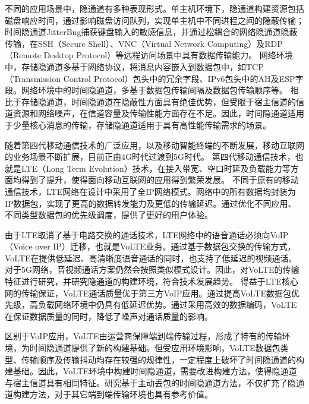 不同的应用场景中，隐通道有多种表现形式。单主机环境下，隐通道构建资源包括磁盘响应时间，通过影响磁盘访问队列，实现单主机中不同进程之间的隐蔽传输；时间隐通道JitterBug捕获键盘输入的敏感信息，并通过松耦合的网络隐通道隐蔽传输，在SSH（Secure Shell）、VNC（Virtual Network Computing）及RDP（Remote Desktop Protocol）等远程访问场景中具有数据传输能力。
网络环境中，存储隐通道多基于网络协议，将消息内容嵌入到数据包中，如TCP（Transmission Control Protocol）包头中的冗余字段、IPv6包头中的AH及ESP字段。网络环境中的时间隐通道，多基于数据包传输间隔及数据包传输顺序等。
相比于存储隐通道，时间隐通道在隐蔽性方面具有绝佳优势，但受限于宿主信道的信道资源和网络噪声，在信道容量及传输性能方面存在不足。因此，时间隐通道适用于少量核心消息的传输，存储隐通道适用于具有高性能传输需求的场景。

随着第四代移动通信技术的广泛应用，以及移动智能终端的不断发展，移动互联网的业务场景不断扩展，目前正由4G时代过渡到5G时代。
第四代移动通信技术，也就是LTE（Long Term Evolution）技术，在接入带宽、空口时延及负载能力等方面均得到了提升，使得面向移动互联网的应用得到繁荣发展。
不同于原有的移动通信技术，LTE网络在设计中采用了全IP网络模式。网络中的所有数据均封装为IP数据包，实现了更高的数据转发能力及更低的传输延迟。通过优化不同应用、不同类型数据包的优先级调度，提供了更好的用户体验。

由于LTE取消了基于电路交换的通话技术，LTE网络中的语音通话必须向VoIP（Voice over IP）迁移，也就是VoLTE业务。通过基于数据包交换的传输方式，VoLTE在提供低延迟、高清晰度语音通话的同时，也支持了低延迟的视频通话。
对于5G网络，音视频通话方案仍然会按照类似模式设计。因此，对VoLTE的传输特征进行研究，并研究隐通道的构建环境，符合技术发展趋势。
得益于LTE核心网的传输保证，VoLTE通话质量优于第三方VoIP应用。通过提高VoLTE数据包优先级，高负载网络环境中仍具有低延迟优势。通过采用高效的数据编码，VoLTE在保证数据质量的同时，降低了噪声对通话质量的影响。

区别于VoIP应用，VoLTE由运营商保障端到端传输过程，形成了特有的传输环境，为时间隐通道提供了新的构建基础。但受应用环境影响，VoLTE数据包类型、传输顺序及传输抖动均存在较强的规律性，一定程度上破坏了时间隐通道的构建基础。因此，VoLTE环境中构建时间隐通道，需要改进构建方法，使得隐通道与宿主信道具有相同特征。研究基于主动丢包的时间隐通道方法，不仅扩充了隐通道构建方法，对于其它端到端传输环境也具有参考价值。